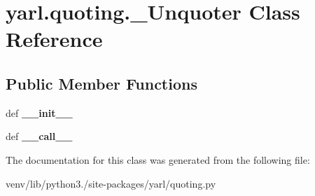 \hypertarget{classyarl_1_1quoting_1_1___unquoter}{}\section{yarl.\+quoting.\+\_\+\+Unquoter Class Reference}
\label{classyarl_1_1quoting_1_1___unquoter}
\subsection*{Public Member Functions}
\begin{DoxyCompactItemize}
\item 
\mbox{\label{classyarl_1_1quoting_1_1___unquoter_aedcbaf95c3f1bb4ca03d9699cbf4fbd5}} 
def {\bfseries \+\_\+\+\_\+init\+\_\+\+\_\+}
\item 
\mbox{\label{classyarl_1_1quoting_1_1___unquoter_a0911a06bb08cf705d7908f097039b699}} 
def {\bfseries \+\_\+\+\_\+call\+\_\+\+\_\+}
\end{DoxyCompactItemize}


The documentation for this class was generated from the following file\+:\begin{DoxyCompactItemize}
\item 
venv/lib/python3./site-\/packages/yarl/quoting.\+py\end{DoxyCompactItemize}

